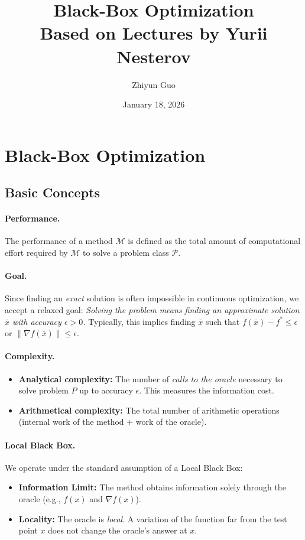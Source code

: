 \documentclass[11pt]{article}
\title{\textbf{\sffamily \Huge Black-Box Optimization\\\large Based on Lectures by Yurii Nesterov}}
\date{January 18, 2026}\fancyhead[R]{\sffamily\footnotesize Black-Box Optimization}
\author{Zhiyun Guo}
\begin{document}
\maketitle

\section{Black-Box Optimization}

\subsection{Basic Concepts}

\paragraph{Performance.} The performance of a method $\mathcal{M}$ is defined as the total amount of computational effort required by $\mathcal{M}$ to solve a problem class $\mathcal{P}$.

\paragraph{Goal.} Since finding an \textit{exact} solution is often impossible in continuous optimization, we accept a relaxed goal: \textit{Solving the problem means finding an approximate solution $\bar{x}$ with accuracy $\epsilon > 0$.} 
Typically, this implies finding $\bar{x}$ such that $f(\bar{x}) - f^* \leq \epsilon$ or $\|\nabla f(\bar{x})\| \leq \epsilon$.

\paragraph{Complexity.}
\begin{itemize}
    \item \textbf{Analytical complexity:} The number of \textit{calls to the oracle} necessary to solve problem $P$ up to accuracy $\epsilon$. This measures the information cost.
    \item \textbf{Arithmetical complexity:} The total number of arithmetic operations (internal work of the method + work of the oracle).
\end{itemize}

\paragraph{Local Black Box.} We operate under the standard assumption of a Local Black Box:
\begin{itemize}
    \item \textbf{Information Limit:} The method obtains information solely through the oracle (e.g., $f(x)$ and $\nabla f(x)$).
    \item \textbf{Locality:} The oracle is \textit{local}. A variation of the function far from the test point $x$ does not change the oracle's answer at $x$.
\end{itemize}
\end{document}
